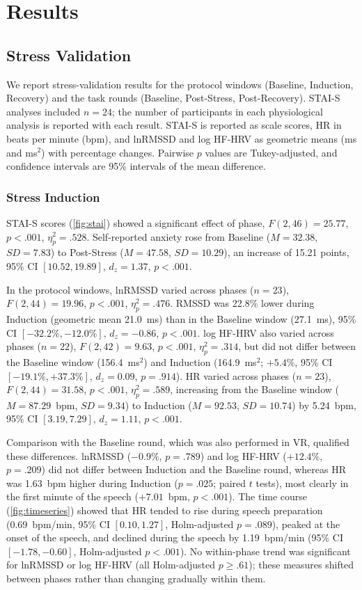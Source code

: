 \section{Results}

\subsection{Stress Validation}

We report stress-validation results for the protocol windows (Baseline, Induction, Recovery) and the task rounds (Baseline, Post-Stress, Post-Recovery). STAI-S analyses included $n=24$; the number of participants in each physiological analysis is reported with each result. STAI-S is reported as scale scores, HR in beats per minute (bpm), and lnRMSSD and log HF-HRV as geometric means (ms and ms$^2$) with percentage changes. Pairwise $p$ values are Tukey-adjusted, and confidence intervals are 95\% intervals of the mean difference.

\subsubsection{Stress Induction}
STAI-S scores (\autoref{fig:stai}) showed a significant effect of phase, $F(2,46)=25.77$, $p<.001$, $\eta_p^2=.528$. Self-reported anxiety rose from Baseline ($M=32.38$, $SD=7.83$) to Post-Stress ($M=47.58$, $SD=10.29$), an increase of 15.21 points, 95\% CI $[10.52, 19.89]$, $d_z=1.37$, $p<.001$.

In the protocol windows, lnRMSSD varied across phases ($n=23$), $F(2,44)=19.96$, $p<.001$, $\eta_p^2=.476$. RMSSD was 22.8\% lower during Induction (geometric mean 21.0~ms) than in the Baseline window (27.1~ms), 95\% CI $[-32.2\%, -12.0\%]$, $d_z=-0.86$, $p<.001$. log HF-HRV also varied across phases ($n=22$), $F(2,42)=9.63$, $p<.001$, $\eta_p^2=.314$, but did not differ between the Baseline window (156.4~ms$^2$) and Induction (164.9~ms$^2$; $+5.4\%$, 95\% CI $[-19.1\%, +37.3\%]$, $d_z=0.09$, $p=.914$). HR varied across phases ($n=23$), $F(2,44)=31.58$, $p<.001$, $\eta_p^2=.589$, increasing from the Baseline window ($M=87.29$~bpm, $SD=9.34$) to Induction ($M=92.53$, $SD=10.74$) by 5.24~bpm, 95\% CI $[3.19, 7.29]$, $d_z=1.11$, $p<.001$.

Comparison with the Baseline round, which was also performed in VR, qualified these differences. lnRMSSD ($-0.9\%$, $p=.789$) and log HF-HRV ($+12.4\%$, $p=.209$) did not differ between Induction and the Baseline round, whereas HR was 1.63~bpm higher during Induction ($p=.025$; paired $t$ tests), most clearly in the first minute of the speech ($+7.01$~bpm, $p<.001$). The time course (\autoref{fig:timeseries}) showed that HR tended to rise during speech preparation (0.69~bpm/min, 95\% CI $[0.10, 1.27]$, Holm-adjusted $p=.089$), peaked at the onset of the speech, and declined during the speech by 1.19~bpm/min (95\% CI $[-1.78, -0.60]$, Holm-adjusted $p<.001$). No within-phase trend was significant for lnRMSSD or log HF-HRV (all Holm-adjusted $p \geq .61$); these measures shifted between phases rather than changing gradually within them.

